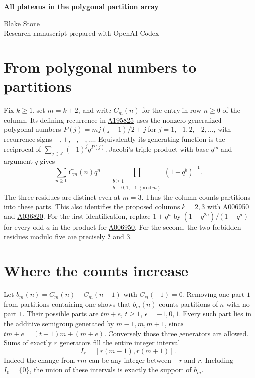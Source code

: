 \documentclass[11pt,letterpaper]{article}
\newcommand{\oeis}[1]{\href{https://oeis.org/A#1}{A#1}}
\begin{document}
\thispagestyle{plain}
\begin{center}
{\LARGE\bfseries All plateaus in the polygonal partition array\par}
\vspace{0.5em}
Blake Stone\\
{\small Research manuscript prepared with OpenAI Codex}
\end{center}

\begin{abstract}
Omar E. Pol conjectured the lengths and levels of every constant run in the columns of OEIS \oeis{195825}. We determine their positions as well. In column $k$ the plateau indexed by $r$ starts at $r(k+3)$, has length $k+1-2r$, and has level equal to the number of three-colored partitions of integers at most $r$. These are all the plateaus of length at least two.
\end{abstract}

\section{From polygonal numbers to partitions}
Fix $k\ge1$, set $m=k+2$, and write $C_m(n)$ for the entry in row $n\ge0$ of the column. Its defining recurrence in \oeis{195825} uses the nonzero generalized polygonal numbers $P(j)=mj(j-1)/2+j$ for $j=1,-1,2,-2,\ldots$, with recurrence signs $+,+,-,-,\ldots$. Equivalently its generating function is the reciprocal of $\sum_{j\in\mathbb Z}(-1)^j q^{P(j)}$. Jacobi's triple product with base $q^m$ and argument $q$ gives
\[
 \sum_{n\ge0}C_m(n)q^n
  =\prod_{\substack{b\ge1\\ b\equiv0,1,-1\;(\mathrm{mod}\ m)}}(1-q^b)^{-1}.
\]
The three residues are distinct even at $m=3$. Thus the column counts partitions into these parts. This also identifies the proposed columns $k=2,3$ with \oeis{006950} and \oeis{036820}. For the first identification, replace $1+q^a$ by $(1-q^{2a})/(1-q^a)$ for every odd $a$ in the product for \oeis{006950}. For the second, the two forbidden residues modulo five are precisely $2$ and $3$.

\section{Where the counts increase}
Let $b_m(n)=C_m(n)-C_m(n-1)$ with $C_m(-1)=0$. Removing one part $1$ from partitions containing one shows that $b_m(n)$ counts partitions of $n$ with no part $1$. Their possible parts are $tm+e$, $t\ge1$, $e=-1,0,1$. Every such part lies in the additive semigroup generated by $m-1,m,m+1$, since $tm+e=(t-1)m+(m+e)$. Conversely those three generators are allowed. Sums of exactly $r$ generators fill the entire integer interval
\[
                       I_r=[r(m-1),r(m+1)] .
\]
Indeed the change from $rm$ can be any integer between $-r$ and $r$. Including $I_0=\{0\}$, the union of these intervals is exactly the support of $b_m$.
\end{document}
